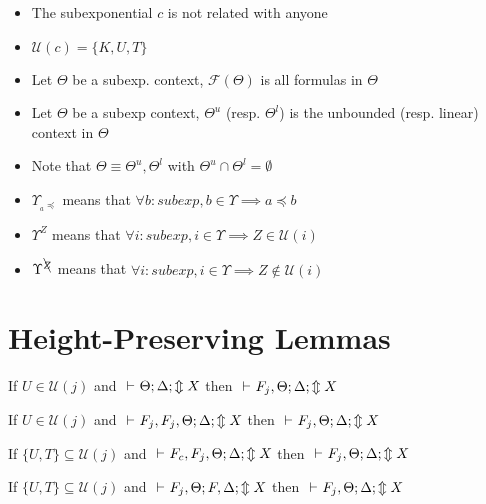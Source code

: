 \documentclass[12pt]{article}
\begin{document}
\begin{itemize}
	\item The subexponential $c$ is not related with anyone
	\item $\mathcal{U}(c)=\{K,U,T\}$
	\item Let $\Theta$ be a subexp. context, $\mathcal{F}(\Theta)$ is all formulas in $\Theta$ 
	\item Let $\Theta$ be a subexp context, $\Theta^u$ (resp. $\Theta^l$) is the unbounded (resp. linear) context in $\Theta$
	\item Note that $\Theta\equiv\Theta^u,\Theta^l$ with $\Theta^u\cap\Theta^l=\emptyset$
	\item  $\Upsilon_{_a\preceq}$ means that $\forall b:subexp, b \in \Upsilon \implies a \preceq b$
	
	\item  $\Upsilon^Z$ means that $\forall i:subexp, i \in \Upsilon \implies Z\in\mathcal{U}(i)$ 
	\item  $\Upsilon^{\bcancel{Z}}$ means that $\forall i:subexp, i \in \Upsilon \implies Z\notin\mathcal{U}(i)$ 

\end{itemize}


\section{Height-Preserving Lemmas}

\begin{theorem}[$\W$]
If $U\in\mathcal{U}(j)$ and	$\mbox{\ $\vdash$\ }\Theta;\Delta;\Updownarrow X$ then $\mbox{\ $\vdash$\ } F_j,\Theta;\Delta;\Updownarrow X$
\end{theorem}

\begin{theorem}[$\C$]
	If $U\in\mathcal{U}(j)$ and	$\mbox{\ $\vdash$\ } F_j,F_j,\Theta;\Delta;\Updownarrow X$ then $\mbox{\ $\vdash$\ } F_j,\Theta;\Delta;\Updownarrow X$
\end{theorem}

\begin{theorem}[$\C_c$]
	If $\{U,T\}\subseteq\mathcal{U}(j)$ and	$\mbox{\ $\vdash$\ } F_c,F_j,\Theta;\Delta;\Updownarrow X$ then $\mbox{\ $\vdash$\ } F_j,\Theta;\Delta;\Updownarrow X$
\end{theorem}

\begin{theorem}[$\A_c$]
	If $\{U,T\}\subseteq\mathcal{U}(j)$ and	$\mbox{\ $\vdash$\ } F_j,\Theta;F,\Delta;\Updownarrow X$ then $\mbox{\ $\vdash$\ } F_j,\Theta;\Delta;\Updownarrow X$
\end{theorem}
\end{document}
